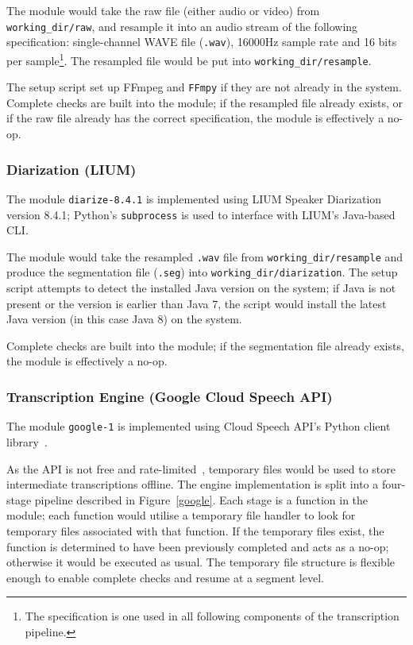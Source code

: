 The module would take the raw file (either audio or video) from
\texttt{working\_dir/raw}, and resample it into an audio stream of the
following specification: single-channel WAVE file (\texttt{.wav}),
16000Hz sample rate and 16 bits per sample\footnote{The specification
is one used in all following components of the transcription pipeline.}.
The resampled file would be put into \texttt{working\_dir/resample}.

The setup script set up FFmpeg and \texttt{FFmpy} if they are not already in
the system. Complete checks are built into the module; if the resampled file
already exists, or if the raw file already has the correct specification, the
module is effectively a no-op.

\subsubsection{Diarization (LIUM)}

The module \texttt{diarize-8.4.1} is implemented using LIUM Speaker
Diarization version 8.4.1; Python's \texttt{subprocess} is used to interface
with LIUM's Java-based CLI\@.

The module would take the resampled \texttt{.wav} file from
\texttt{working\_dir/resample} and produce the segmentation file
(\texttt{.seg}) into \texttt{working\_dir/diarization}. The setup script
attempts to detect the installed Java version on the system; if Java is
not present or the version is earlier than Java 7, the script would
install the latest Java version (in this case Java 8) on the system.

Complete checks are built into the module; if the segmentation file
already exists, the module is effectively a no-op.

\subsubsection{Transcription Engine (Google Cloud Speech API)}

The module \texttt{google-1} is implemented using Cloud Speech API's
Python client library~\cite{gh-gcs}.

As the API is not free and rate-limited~\cite{gcs-free}, temporary files
would be used to store intermediate transcriptions offline. The engine
implementation is split into a four-stage pipeline described in
Figure~\ref{google}. Each stage is a function in the module; each function
would utilise a temporary file handler to look for temporary files
associated with that function. If the temporary files exist, the function
is determined to have been previously completed and acts as a no-op;
otherwise it would be executed as usual. The temporary file structure is
flexible enough to enable complete checks and resume at a segment level.

